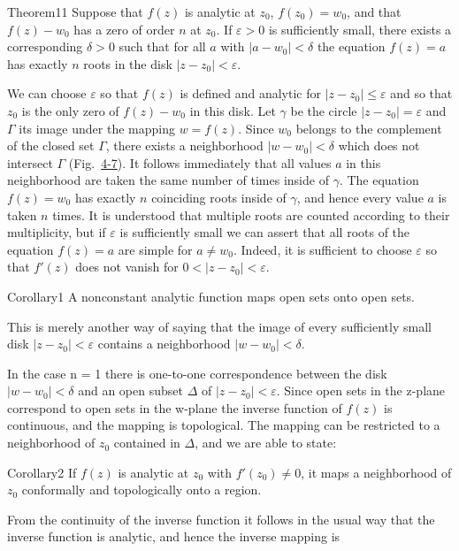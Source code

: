 \begin{originalstatement}{Theorem}{11}\label{thm:4.11}
Suppose that $f(z)$ is analytic at $z_0$, $f(z_0) = w_0$, and that $f(z) - w_0$ has a zero of order $n$ at $z_0$. If $\varepsilon > 0$ is sufficiently small, there exists a corresponding $\delta > 0$ such that for all $a$ with $|a - w_0| < \delta$ the equation $f(z) = a$ has exactly $n$ roots in the disk $|z - z_0| < \varepsilon$.
\end{originalstatement}

We can choose $\varepsilon$ so that $f(z)$ is defined and analytic for $|z - z_0| \leq \varepsilon$ and so that $z_0$ is the only zero of $f(z) - w_0$ in this disk. Let $\gamma$ be the circle $|z - z_0| = \varepsilon$ and $\Gamma$ its image under the mapping $w = f(z)$. Since $w_0$ belongs to the complement of the closed set $\Gamma$, there exists a neighborhood $|w - w_0| < \delta$ which does not intersect $\Gamma$ (Fig.~\hyperref[fig:4-7]{4-7}). It follows immediately that all values $a$ in this neighborhood are taken the same number of times inside of $\gamma$. The equation $f(z) = w_0$ has exactly $n$ coinciding roots inside of $\gamma$, and hence every value $a$ is taken $n$ times. It is understood that multiple roots are counted according to their multiplicity, but if $\varepsilon$ is sufficiently small we can assert that all roots of the equation $f(z) = a$ are simple for $a \neq w_0$. Indeed, it is sufficient to choose $\varepsilon$ so that $f'(z)$ does not vanish for $0 < |z - z_0| < \varepsilon$.

\begin{originalstatement}{Corollary}{1}\label{cor:4.1}
A nonconstant analytic function maps open sets onto open sets.
\end{originalstatement}
This is merely another way of saying that the image of every sufficiently small disk $|z - z_{0}| < \varepsilon$ contains a neighborhood $|w - w_{0}| < \delta$.

In the case n = 1 there is one-to-one correspondence between the disk $|w - w_{0}| < \delta$ and an open subset $\Delta$ of $|z - z_{0}| < \varepsilon$. Since open sets in the z-plane correspond to open sets in the w-plane the inverse function of $f(z)$ is continuous, and the mapping is topological. The mapping can be restricted to a neighborhood of $z_{0}$ contained in $\Delta$, and we are able to state:

\begin{originalstatement}{Corollary}{2}\label{cor:4.2}
If $f(z)$ is analytic at $z_0$ with $f'(z_0) \neq 0$, it maps a neighborhood of $z_0$ conformally and topologically onto a region.
\end{originalstatement}
From the continuity of the inverse function it follows in the usual way that the inverse function is analytic, and hence the inverse mapping is

